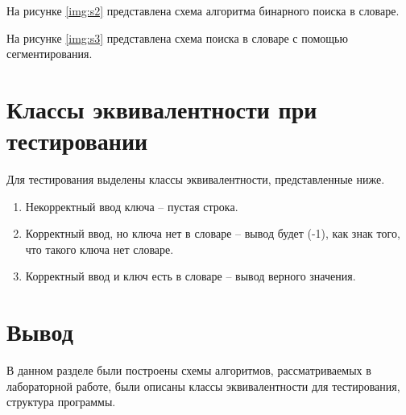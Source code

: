 \clearpage

На рисунке \ref{img:s2} представлена схема алгоритма бинарного поиска в словаре.

\clearpage

На рисунке \ref{img:s3} представлена схема поиска в словаре с помощью сегментирования.

\clearpage


\section{Классы эквивалентности при тестировании}
Для тестирования выделены классы эквивалентности, представленные ниже.
\begin{enumerate}
	\item Некорректный ввод ключа -- пустая строка.
	\item Корректный ввод, но ключа нет в словаре -- вывод будет (-1), как знак того, что такого ключа нет словаре.
	\item Корректный ввод и ключ есть в словаре -- вывод верного значения.
\end{enumerate}

\section{Вывод}
В данном разделе были построены схемы алгоритмов, рассматриваемых в лабораторной работе, были описаны классы эквивалентности для тестирования, структура программы.